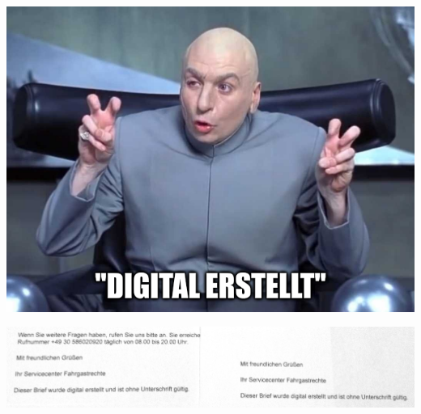 \documentclass{beamer}
\begin{document}
	\begin{frame}[plain]
		\vspace{-0.25cm}
		\begin{center}
			\hspace*{-1.2cm}
			\includegraphics[width=1.2\textwidth]{images/digital erstellt}
		\end{center}
	\end{frame}

	\begin{frame}[plain]
		\begin{center}
			\vspace*{1cm}
			\hspace*{-1cm}
			\includegraphics[width=1.15\textwidth]{images/bahn-brief-abschied}
		\end{center}
	\end{frame}
\end{document}
